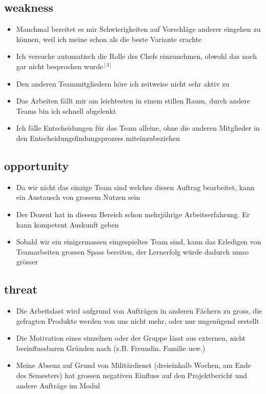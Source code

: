 \documentclass[11pt,twoside]{hsrthesis}
\begin{document}
\subsection{weakness}
\begin{itemize}
\item Manchmal bereitet es mir Schwierigkeiten auf Vorschläge anderer eingehen zu können, weil ich meine schon als die beste Variante erachte
\item Ich versuche automatisch die Rolle des Chefs einzunehmen, obwohl das noch gar nicht besprochen wurde$^{[3]}$ 
\item Den anderen Teammitgliedern höre ich zeitweise nicht sehr aktiv zu
\item Das Arbeiten fällt mir am leichtesten in einem stillen Raum, durch andere Teams bin ich schnell abgelenkt
\item Ich fälle Entscheidungen für das Team alleine, ohne die anderen Mitglieder in den Entscheidungsfindungsprozess miteinzubeziehen 
\end{itemize}

\subsection{opportunity}
\begin{itemize}
\item Da wir nicht das einzige Team sind welches diesen Auftrag bearbeitet, kann ein Austausch von grossem Nutzen sein
\item Der Dozent hat in diesem Bereich schon mehrjährige Arbeitserfahrung. Er kann kompetent Auskunft geben
\item Sobald wir ein einigermassen eingespieltes Team sind, kann das Erledigen von Teamarbeiten grossen Spass bereiten, der Lernerfolg würde dadurch umso grösser
\end{itemize}


\subsection{threat}
\begin{itemize}
\item Die Arbeitslast wird aufgrund von Aufträgen in anderen Fächern zu gross, die gefragten Produkte werden von uns nicht mehr, oder nur ungenügend erstellt
\item Die Motivation eines einzelnen oder der Gruppe lässt aus externen, nicht beeinflussbaren Gründen nach (z.B. Freundin, Familie usw.)
\item Meine Absenz auf Grund von Militärdienst (dreieinhalb Wochen, am Ende des Semesters) hat grossen negativen Einfluss auf den Projektbericht und andere Aufträge im Modul
\end{itemize}
\end{document}
